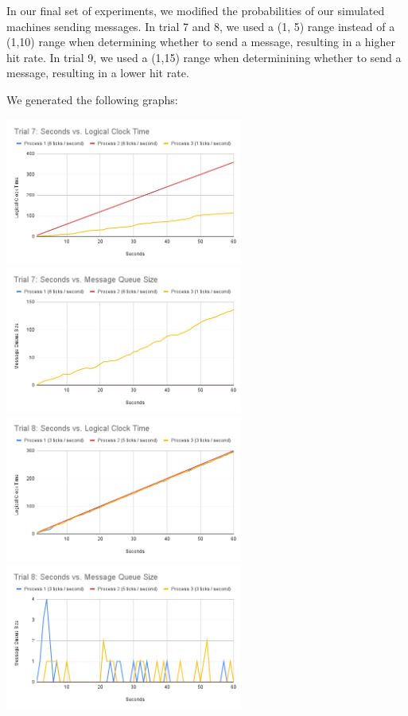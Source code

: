 \documentclass[
	a4paper, %
	10pt, %
	unnumberedsections, %
	twoside, %
]{LTJournalArticle}
\begin{document}
In our final set of experiments, we modified the probabilities of our simulated machines sending messages. In trial 7 and 8, we used a (1, 5) range instead of a (1,10) range when determining whether to send a message, resulting in a higher hit rate. In trial 9, we used a (1,15) range when determinining whether to send a message, resulting in a lower hit rate. 

We generated the following graphs: 

\includegraphics[width=7.8cm]{assets/t7_clock.png}
\includegraphics[width=7.8cm]{assets/t7_size.png}
\includegraphics[width=7.8cm]{assets/t8_clock.png}
\includegraphics[width=7.8cm]{assets/t8_size.png}
\end{document}
